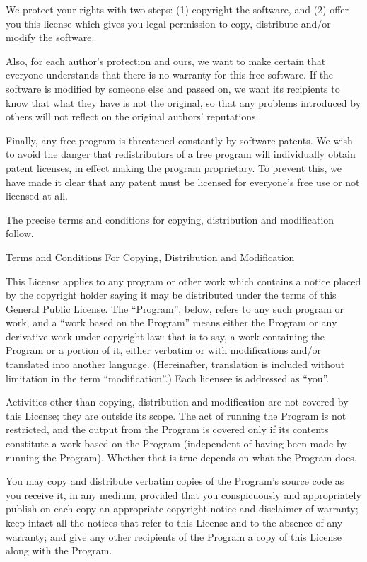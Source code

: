 \begin{lrbox}{\gpl}
\begin{minipage}{3\textwidth}
We protect your rights with two steps: (1) copyright the software, and (2)
offer you this license which gives you legal permission to copy,
distribute and/or modify the software.

Also, for each author's protection and ours, we want to make certain that
everyone understands that there is no warranty for this free software.  If
the software is modified by someone else and passed on, we want its
recipients to know that what they have is not the original, so that any
problems introduced by others will not reflect on the original authors'
reputations.

Finally, any free program is threatened constantly by software patents.
We wish to avoid the danger that redistributors of a free program will
individually obtain patent licenses, in effect making the program
proprietary.  To prevent this, we have made it clear that any patent must
be licensed for everyone's free use or not licensed at all.

The precise terms and conditions for copying, distribution and
modification follow.

\begincentered
	{\Large \sc Terms and Conditions For Copying, Distribution and
	 Modification}
\endcentered

\beginenumeration
\item
This License applies to any program or other work which contains a notice
placed by the copyright holder saying it may be distributed under the
terms of this General Public License.  The ``Program'', below, refers to
any such program or work, and a ``work based on the Program'' means either
the Program or any derivative work under copyright law: that is to say, a
work containing the Program or a portion of it, either verbatim or with
modifications and/or translated into another language.  (Hereinafter,
translation is included without limitation in the term ``modification''.)
Each licensee is addressed as ``you''.

Activities other than copying, distribution and modification are not
covered by this License; they are outside its scope.  The act of
running the Program is not restricted, and the output from the Program
is covered only if its contents constitute a work based on the
Program (independent of having been made by running the Program).
Whether that is true depends on what the Program does.

\item You may copy and distribute verbatim copies of the Program's source
  code as you receive it, in any medium, provided that you conspicuously
  and appropriately publish on each copy an appropriate copyright notice
  and disclaimer of warranty; keep intact all the notices that refer to
  this License and to the absence of any warranty; and give any other
  recipients of the Program a copy of this License along with the Program.


\end{minipage}
\end{lrbox}
